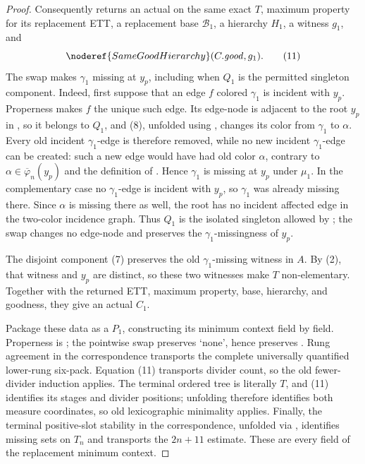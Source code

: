 \begin{proof}
Consequently  returns an actual
 on the same exact \(T\),
maximum property for its replacement ETT, a replacement base
\(\mathcal B_1\), a hierarchy \(H_1\), a 
witness \(g_1\), and
\[
             \noderef{SameGoodHierarchy}(C.\mathit{good},g_1). \tag{11}
\]
The swap makes \(\gamma_1\) missing at \(y_p\), including when \(Q_1\) is
the permitted singleton component.  Indeed, first suppose that an edge
\(f\) colored \(\gamma_1\) is incident with \(y_p\).  Properness makes
\(f\) the unique such edge.  Its edge-node is adjacent to the root
\(y_p\) in , so it belongs to \(Q_1\),
and (8), unfolded using , changes its color
from \(\gamma_1\) to \(\alpha\).  Every old incident
\(\gamma_1\)-edge is therefore removed, while no new incident
\(\gamma_1\)-edge can be created: such a new edge would have had old color
\(\alpha\), contrary to \(\alpha\in\overline\varphi_n(y_p)\) and the
definition of .  Hence \(\gamma_1\) is missing at
\(y_p\) under \(\mu_1\).  In the complementary case no
\(\gamma_1\)-edge is incident with \(y_p\), so \(\gamma_1\) was already
missing there.  Since \(\alpha\) is missing there as well, the root has no
incident affected edge in the two-color incidence graph.  Thus \(Q_1\) is
the isolated singleton allowed by ; the
swap changes no edge-node and preserves the \(\gamma_1\)-missingness of
\(y_p\).

The disjoint component (7) preserves the old \(\gamma_1\)-missing witness
in \(A\).  By (2), that witness and \(y_p\) are distinct, so these two
witnesses make \(T\) non-elementary.  Together with the returned
ETT, maximum property, base, hierarchy, and goodness, they give an actual
 \(C_1\).

Package these data as a
 \(P_1\), constructing its
minimum context field by field.  Properness is
; the pointwise swap preserves
`none', hence preserves .  Rung agreement in
the correspondence transports the complete universally quantified
lower-rung six-pack.  Equation (11) transports divider count, so the old
fewer-divider induction applies.  The terminal ordered tree is literally
\(T\), and (11) identifies its stages and divider positions; unfolding
 therefore identifies both
measure coordinates, so old lexicographic minimality applies.  Finally,
the terminal positive-slot stability in the correspondence, unfolded via
, identifies missing sets on \(T_n\) and transports
the \(2n+11\) estimate.  These are every field of the replacement minimum
context.


\end{proof}

